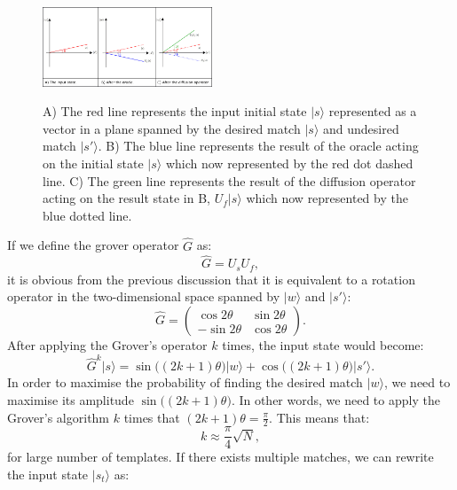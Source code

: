 \documentclass[aps,prd,nofootinbib,twocolumn,reprint,superscriptaddress,showpacs,showkeys,longbibliography]{revtex4-1}
\newcommand{\ket}[1]{|#1\rangle}
\begin{document}
\begin{figure}[h]
{\caption{A) The red line represents the input initial state $\ket{s}$ represented as a vector in a plane spanned by the desired match $\ket{s}$ and undesired match $\ket{s'}$. B) The blue line represents the result of the oracle acting on the initial state $\ket{s}$ which now represented by the red dot dashed line. C) The green line represents the result of the diffusion operator acting on the result state in B, $U_f\ket{s}$ which now represented by the blue dotted line.   }\label{2d0}}
{\includegraphics[width=0.45\textwidth]{Grover.png}}
 \end{figure}
If we define the grover operator $\hat{G}$ as:
\begin{equation}
    \label{Gdef}
    \hat{G}= U_sU_f,
\end{equation}
it is obvious from the previous discussion that it is equivalent to a rotation operator in the two-dimensional space spanned by $\ket{w}$ and $\ket{s'}$:
\begin{equation}
    \label{Gmatrix}
    \hat{G}=\begin{pmatrix}
\cos{2\theta} & \sin{2\theta} \\
-\sin{2\theta} & \cos{2\theta} 
\end{pmatrix}.
\end{equation}
After applying the Grover's operator $k$ times, the input state would become:
\begin{equation}
    \label{Gks}
    \hat{G}^k \ket{s}= \sin{\big((2k+1)\theta\big)}\ket{w}+\cos{\big((2k+1)\theta\big)}\ket{s'}.
\end{equation}
In order to maximise the probability of finding the desired match $\ket{w}$, we need to maximise its amplitude $\sin{\big((2k+1)\theta\big)}$. In other words, we need to apply the Grover's algorithm $k$ times that $(2k+1)\theta=\frac{\pi}{2}$. This means that:
\begin{equation}
\label{k}
    k\approx\frac{\pi}{4}\sqrt{N},
\end{equation}
for large number of templates.
\newline \newline
If there exists multiple matches, we can rewrite the input state $\ket{s_t}$ as:
\end{document}
